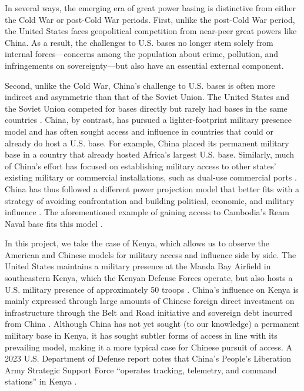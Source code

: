 In several ways, the emerging era of great power basing is distinctive from either the Cold War or post-Cold War periods. First, unlike the post-Cold War period, the United States faces geopolitical competition from near-peer great powers like China. As a result, the challenges to U.S. bases no longer stem solely from internal forces—concerns among the population about crime, pollution, and infringements on sovereignty—but also have an essential external component\cite{allen2023}.

Second, unlike the Cold War, China's challenge to U.S. bases is often more indirect and asymmetric than that of the Soviet Union. The United States and the Soviet Union competed for bases directly but rarely had bases in the same countries \cite{Nieman2020}. China, by contrast, has pursued a lighter-footprint military presence model and has often sought access and influence in countries that could or already do host a U.S. base. For example, China placed its permanent military base in a country that already hosted Africa's largest U.S. base. Similarly, much of China's effort has focused on establishing military access to other states' existing military or commercial installations, such as dual-use commercial ports \cite{kardon2022}. China has thus followed a different power projection model that better fits with a strategy of avoiding confrontation and building political, economic, and military influence \cite{Doshi2021}. The aforementioned example of gaining access to Cambodia's Ream Naval base fits this model \cite{gan2023}.


In this project, we take the case of Kenya, which allows us to observe the American and Chinese models for military access and influence side by side. The United States maintains a military presence at the Manda Bay Airfield in southeastern Kenya, which the Kenyan Defense Forces operate, but also hosts a U.S. military presence of approximately 50 troops \cite{allen2022}. China's influence on Kenya is mainly expressed through large amounts of Chinese foreign direct investment on infrastructure through the Belt and Road initiative and sovereign debt incurred from China \cite{lesutis2021}. Although China has not yet sought (to our knowledge) a permanent military base in Kenya, it has sought subtler forms of access in line with its prevailing model, making it a more typical case for Chinese pursuit of access. A 2023 U.S. Department of Defense report notes that China's People's Liberation Army Strategic Support Force ``operates tracking, telemetry, and command stations'' in Kenya \cite{DOD2023}. 

